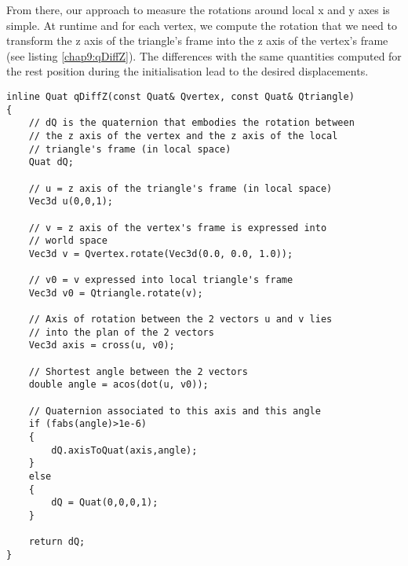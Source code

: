 From there, our approach to measure the rotations around local x and y axes is simple. At runtime and for each vertex, we compute the rotation that we need to transform the z axis of the triangle's frame into the z axis of the vertex's frame (see listing \ref{chap9:qDiffZ}). The differences with the same quantities computed for the rest position during the initialisation lead to the desired displacements. 
%
\begin{lstlisting}[caption={[Method to compute the rotation between two quaternions]Method used to compute the rotation of the z axis between the frames embodied by two quaternions},label={chap9:qDiffZ},frame=shadowbox,rulesepcolor=\color{black}]
inline Quat qDiffZ(const Quat& Qvertex, const Quat& Qtriangle)
{
    // dQ is the quaternion that embodies the rotation between 
    // the z axis of the vertex and the z axis of the local 
    // triangle's frame (in local space)
    Quat dQ;

    // u = z axis of the triangle's frame (in local space)
    Vec3d u(0,0,1);

    // v = z axis of the vertex's frame is expressed into 
    // world space
    Vec3d v = Qvertex.rotate(Vec3d(0.0, 0.0, 1.0));
    
    // v0 = v expressed into local triangle's frame
    Vec3d v0 = Qtriangle.rotate(v);

    // Axis of rotation between the 2 vectors u and v lies 
    // into the plan of the 2 vectors
    Vec3d axis = cross(u, v0);
    
    // Shortest angle between the 2 vectors
    double angle = acos(dot(u, v0));

    // Quaternion associated to this axis and this angle
    if (fabs(angle)>1e-6)
    {
        dQ.axisToQuat(axis,angle);
    }
    else
    {
        dQ = Quat(0,0,0,1);
    }

    return dQ;
}
\end{lstlisting}


%
%


